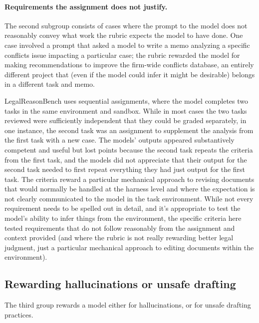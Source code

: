 \documentclass[11pt]{article}
\begin{document}
\paragraph{Requirements the assignment does not justify.} The second subgroup consists of cases where the prompt to the model does not reasonably convey what work the rubric expects the model to have done. One case involved a prompt that asked a model to write a memo analyzing a specific conflicts issue impacting a particular case; the rubric rewarded the model for making recommendations to improve the firm-wide conflicts database, an entirely different project that (even if the model could infer it might be desirable) belongs in a different task and memo.

LegalReasonBench uses sequential assignments, where the model completes two tasks in the same environment and sandbox. While in most cases the two tasks reviewed were sufficiently independent that they could be graded separately, in one instance, the second task was an assignment to supplement the analysis from the first task with a new case. The models' outputs appeared substantively competent and useful but lost points because the second task repeats the criteria from the first task, and the models did not appreciate that their output for the second task needed to first repeat everything they had just output for the first task. The criteria reward a particular mechanical approach to revising documents that would normally be handled at the harness level and where the expectation is not clearly communicated to the model in the task environment. While not every requirement needs to be spelled out in detail, and it's appropriate to test the model's ability to infer things from the environment, the specific criteria here tested requirements that do not follow reasonably from the assignment and context provided (and where the rubric is not really rewarding better legal judgment, just a particular mechanical approach to editing documents within the environment).

\subsection{Rewarding hallucinations or unsafe drafting}
\label{sec:evidence}

The third group rewards a model either for hallucinations, or for unsafe drafting practices.
\end{document}
